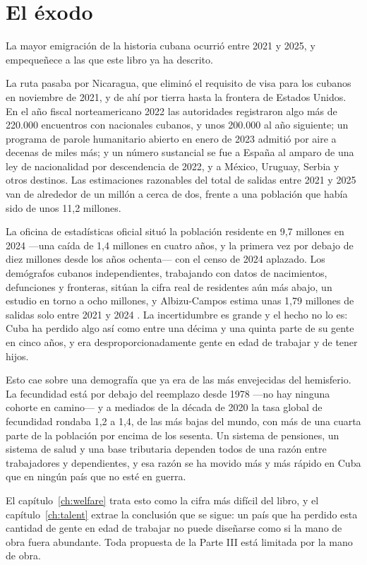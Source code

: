 \section{El éxodo}

La mayor emigración de la historia cubana ocurrió entre 2021 y 2025, y empequeñece
a las que este libro ya ha descrito.

La ruta pasaba por Nicaragua, que eliminó el requisito de visa para los cubanos en
noviembre de 2021, y de ahí por tierra hasta la frontera de Estados Unidos. En el
año fiscal norteamericano 2022 las autoridades registraron algo más de 220.000
encuentros con nacionales cubanos, y unos 200.000 al año siguiente; un programa de
parole humanitario abierto en enero de 2023 admitió por aire a decenas de miles
más; y un número sustancial se fue a España al amparo de una ley de nacionalidad
por descendencia de 2022, y a México, Uruguay, Serbia y otros destinos.\unv{} Las
estimaciones razonables del total de salidas entre 2021 y 2025 van de alrededor de
un millón a cerca de dos, frente a una población que había sido de unos 11,2
millones.

La oficina de estadísticas oficial situó la población residente en 9,7 millones en
2024 ---una caída de 1,4 millones en cuatro años, y la primera vez por debajo de
diez millones desde los años ochenta--- con el censo de 2024 aplazado. Los
demógrafos cubanos independientes, trabajando con datos de nacimientos, defunciones
y fronteras, sitúan la cifra real de residentes aún más abajo, un estudio en torno
a ocho millones, y Albizu-Campos estima unas 1,79 millones de salidas solo entre
2021 y 2024 \citep{onei}.\unv{} La incertidumbre es grande y el hecho no lo es:
Cuba ha perdido algo así como entre una décima y una quinta parte de su gente en
cinco años, y era desproporcionadamente gente en edad de trabajar y de tener hijos.

Esto cae sobre una demografía que ya era de las más envejecidas del hemisferio. La
fecundidad está por debajo del reemplazo desde 1978 ---no hay ninguna cohorte en
camino--- y a mediados de la década de 2020 la tasa global de fecundidad rondaba
1,2 a 1,4, de las más bajas del mundo, con más de una cuarta parte de la población
por encima de los sesenta.\unv{} Un sistema de pensiones, un sistema de salud y una
base tributaria dependen todos de una razón entre trabajadores y dependientes, y
esa razón se ha movido más y más rápido en Cuba que en ningún país que no esté en
guerra.

El capítulo~\ref{ch:welfare} trata esto como la cifra más difícil del libro, y el
capítulo~\ref{ch:talent} extrae la conclusión que se sigue: un país que ha perdido
esta cantidad de gente en edad de trabajar no puede diseñarse como si la mano de
obra fuera abundante. Toda propuesta de la Parte III está limitada por la mano de
obra.

